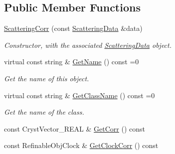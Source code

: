 \subsection*{Public Member Functions}
\begin{DoxyCompactItemize}
\item 
\mbox{\label{class_obj_cryst_1_1_scattering_corr_ac1e37a73b0a107f66d1b1d75b9db9c47}} 
\mbox{\hyperlink{class_obj_cryst_1_1_scattering_corr_ac1e37a73b0a107f66d1b1d75b9db9c47}{Scattering\+Corr}} (const \mbox{\hyperlink{class_obj_cryst_1_1_scattering_data}{Scattering\+Data}} \&data)
\begin{DoxyCompactList}\small\item\em Constructor, with the associated \mbox{\hyperlink{class_obj_cryst_1_1_scattering_data}{Scattering\+Data}} object. \end{DoxyCompactList}\item 
\mbox{\label{class_obj_cryst_1_1_scattering_corr_adb2782d4e32cbcb89e2e69b3c8ad66fb}} 
virtual const string \& \mbox{\hyperlink{class_obj_cryst_1_1_scattering_corr_adb2782d4e32cbcb89e2e69b3c8ad66fb}{Get\+Name}} () const =0
\begin{DoxyCompactList}\small\item\em Get the name of this object. \end{DoxyCompactList}\item 
\mbox{\label{class_obj_cryst_1_1_scattering_corr_a6d72e7a6ffff0c16d86930d9e72c6673}} 
virtual const string \& \mbox{\hyperlink{class_obj_cryst_1_1_scattering_corr_a6d72e7a6ffff0c16d86930d9e72c6673}{Get\+Class\+Name}} () const =0
\begin{DoxyCompactList}\small\item\em Get the name of the class. \end{DoxyCompactList}\item 
const Cryst\+Vector\+\_\+\+R\+E\+AL \& \mbox{\hyperlink{class_obj_cryst_1_1_scattering_corr_a984d75f2c772be383be38cb393183281}{Get\+Corr}} () const
\item 
const Refinable\+Obj\+Clock \& \mbox{\hyperlink{class_obj_cryst_1_1_scattering_corr_abc7dc22888637bc062f2124694005404}{Get\+Clock\+Corr}} () const
\end{DoxyCompactItemize}
